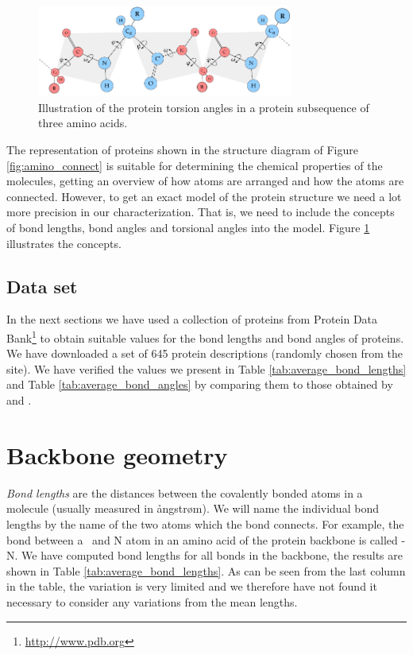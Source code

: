 \begin{figure}
  \centering
  \includegraphics[width=0.75\textwidth]{figures/protein-torsion-angles}
  \caption{Illustration of the protein torsion angles in a protein
    subsequence of three amino acids.}
  \label{fig:protein-torsion-angles}
\end{figure}

The representation of proteins shown in the structure diagram of
Figure \ref{fig:amino_connect} is suitable for determining the
chemical properties of the molecules, getting an overview of how atoms
are arranged and how the atoms are connected. However, to get an exact
model of the protein structure we need a lot more precision in our
characterization. That is, we need to include the concepts of bond
lengths, bond angles and torsional angles into the model.  Figure
\ref{fig:protein-torsion-angles} illustrates the concepts.

\subsection{Data set}
In the next sections we have used a collection of proteins from
Protein Data Bank\footnote{\url{http://www.pdb.org}} to obtain suitable
values for the bond lengths and bond angles of proteins. We have
downloaded a set of 645 protein descriptions (randomly chosen from the
site). We have verified the values we present in Table
\ref{tab:average_bond_lengths} and Table \ref{tab:average_bond_angles}
by comparing them to those obtained by \cite{probik} and
\cite{laskowski1993main}.

\section{Backbone geometry}
\textit{Bond lengths} are the distances between the covalently bonded atoms
in a molecule (usually measured in ångstrøm). We will name the
individual bond lengths by the name of the two atoms which the bond
connects. For example, the bond between a \Ca\ and N atom in an amino acid of
the protein backbone is called \Ca -N. We have computed bond lengths
for all bonds in the backbone, the results are shown in Table
\ref{tab:average_bond_lengths}. As can be seen from the last column in
the table, the variation is very limited and we therefore have not
found it necessary to consider any variations from the mean
lengths. 

